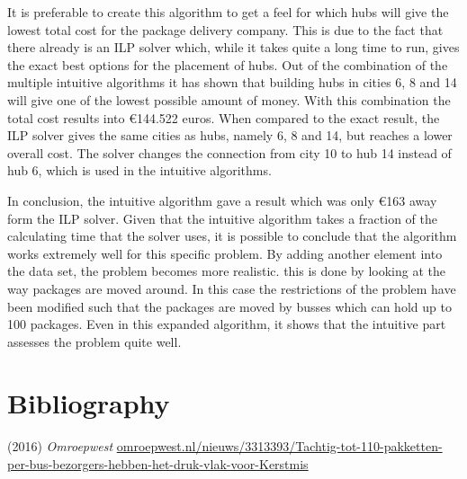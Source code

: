 \documentclass{article}
\begin{document}
It is preferable to create this algorithm to get a feel for which hubs will give the lowest total cost for the package delivery company. This is due to the fact that there already is an ILP solver which, while it takes quite a long time to run, gives the exact best options for the placement of hubs.  
Out of the combination of the multiple intuitive algorithms it has shown that building hubs in cities 6, 8 and 14 will give one of the lowest possible amount of money. With this combination the total cost results into €144.522 euros. When compared to the exact result, the ILP solver gives the same cities as hubs, namely 6, 8 and 14, but reaches a lower overall cost. The solver changes the connection from city 10 to hub 14 instead of hub 6, which is used in the intuitive algorithms. 

In conclusion, the intuitive algorithm gave a result which was only €163 away form the ILP solver. Given that the intuitive algorithm takes a fraction of the calculating time that the solver uses, it is possible to conclude that the algorithm works extremely well for this specific problem. %
By adding another element into the data set, the problem becomes more realistic. this is done by looking at the way packages are moved around. In this case the restrictions of the problem have been modified such that the packages are moved by busses which can hold up to 100 packages. Even in this expanded algorithm, it shows that the intuitive part assesses the problem quite well. 

\newpage
\section*{Bibliography}
\begin{thebibliography}{9}

(2016) \textit{Omroepwest}
\url{omroepwest.nl/nieuws/3313393/Tachtig-tot-110-pakketten-per-bus-bezorgers-hebben-het-druk-vlak-voor-Kerstmis}



\end{thebibliography}

\newpage

\appendix
\end{document}
